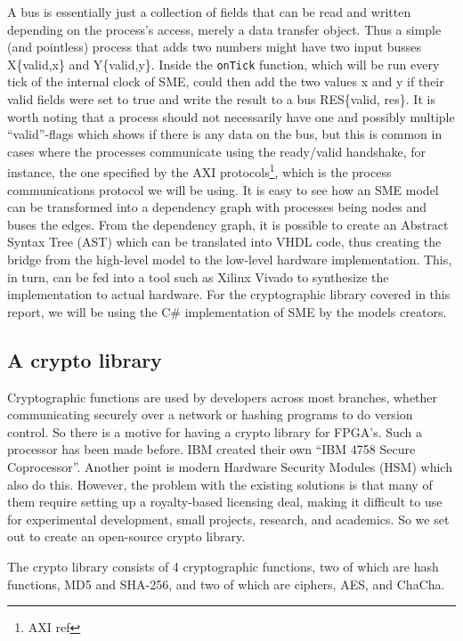 \documentclass[a4paper]{article}
\begin{document}
A bus is essentially just a collection of fields that can be read and written depending on the process's access, merely a data transfer object. Thus a simple (and pointless) process that adds two numbers might have two input busses X\{valid,x\} and Y\{valid,y\}. Inside the \texttt{onTick} function, which will be run every tick of the internal clock of SME, could then add the two values x and y if their valid fields were set to true and write the result to a bus RES\{valid, res\}. It is worth noting that a process should not necessarily have one and possibly multiple ``valid''-flags which shows if there is any data on the bus, but this is common in cases where the processes communicate using the ready/valid handshake, for instance, the one specified by the AXI protocols\footnote{AXI ref}, which is the process communications protocol we will be using. It is easy to see how an SME model can be transformed into a dependency graph with processes being nodes and buses the edges. From the dependency graph, it is possible to create an Abstract Syntax Tree (AST) which can be translated into VHDL code\cite{sme}, thus creating the bridge from the high-level model to the low-level hardware implementation. This, in turn, can be fed into a tool such as Xilinx Vivado to synthesize the implementation to actual hardware. For the cryptographic library covered in this report, we will be using the C\# implementation of SME by the models creators\cite{sme}.
\subsection{A crypto library}
\label{sec:orge0685d3}
Cryptographic functions are used by developers across most branches, whether communicating securely over a network or hashing programs to do version control.
So there is a motive for having a crypto library for FPGA's. Such a processor has been made before. IBM created their own ``IBM 4758 Secure Coprocessor''\cite{IBM4758}. Another point is modern Hardware Security Modules (HSM) which also do this.
However, the problem with the existing solutions is that many of them require setting up a royalty-based licensing deal, making it difficult to use for experimental development, small projects, research, and academics.
So we set out to create an open-source crypto library.

The crypto library consists of 4 cryptographic functions, two of which are hash functions, MD5 and SHA-256, and two of which are ciphers, AES, and ChaCha.
\end{document}

